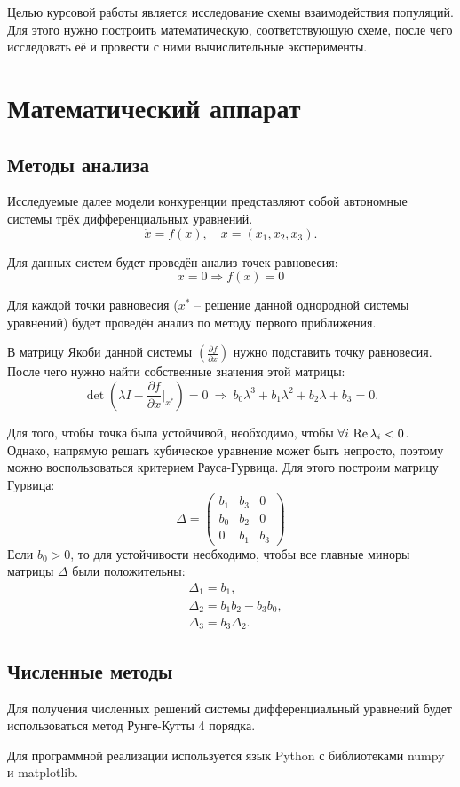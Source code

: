     Целью курсовой работы является исследование схемы взаимодействия популяций. Для этого нужно построить математическую, соответствующую схеме, после чего исследовать её и провести с ними вычислительные эксперименты. 


\pagebreak

\section{Математический аппарат}
    \subsection{Методы анализа}
    Исследуемые далее модели конкуренции представляют собой автономные системы трёх дифференциальных уравнений.
    \[
        \dot{x} = f(x), \quad x = (x_1, x_2, x_3).
    \]

    Для данных систем будет проведён анализ точек равновесия:
    \[
        \dot{x} = 0 \Rightarrow f(x) = 0
    \]

    Для каждой точки равновесия (\( x^* \) -- решение данной однородной системы уравнений) будет проведён анализ по методу первого приближения\cite{filipov}.

    В матрицу Якоби данной системы \( \left( \frac{\partial f}{\partial x} \right) \) нужно подставить точку равновесия. После чего нужно найти собственные значения этой матрицы:
    \[
        \det \left( \lambda I - \frac{\partial f}{\partial x}\big|_{x^*} \right) = 0 ~ \Rightarrow ~ b_0 \lambda^3 + b_1 \lambda^2 + b_2 \lambda + b_3 = 0.
    \]

    Для того, чтобы точка была устойчивой, необходимо, чтобы \( \forall i \, \operatorname{Re} \lambda_i < 0 \). Однако, напрямую решать кубическое уравнение может быть непросто, поэтому можно воспользоваться критерием Рауса-Гурвица\cite{nefedov}. Для этого построим матрицу Гурвица: 
    \[
        \Delta = \left( \begin{matrix}
            b_1 & b_3 & 0 \\
            b_0 & b_2 & 0 \\
            0   & b_1 & b_3
        \end{matrix} \right)
    \]
    Если \( b_0 > 0\), то для устойчивости необходимо, чтобы все главные миноры матрицы \( \Delta \) были положительны:
    \[
        \begin{split}
            & \Delta_1 = b_1, \\
            & \Delta_2 = b_1 b_2 - b_3 b_0, \\
            & \Delta_3 = b_3 \Delta_2.
        \end{split}
    \]

    \subsection{Численные методы}
    Для получения численных решений системы дифференциальный уравнений будет использоваться метод Рунге-Кутты 4 порядка\cite{berez}.

    Для программной реализации используется язык Python с библиотеками numpy и matplotlib.
